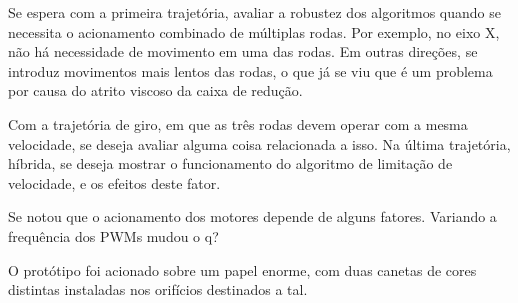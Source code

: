 Se espera com a primeira trajetória, avaliar a robustez dos algoritmos quando se necessita o acionamento combinado de múltiplas rodas. Por exemplo, no eixo X, não há necessidade de movimento em uma das rodas. Em outras direções, se introduz movimentos mais lentos das rodas, o que já se viu que é um problema por causa do atrito viscoso da caixa de redução.

Com a trajetória de giro, em que as três rodas devem operar com a mesma velocidade, se deseja avaliar alguma coisa relacionada a isso. Na última trajetória, híbrida, se deseja mostrar o funcionamento do algoritmo de limitação de velocidade, e os efeitos deste fator.

Se notou que o acionamento dos motores depende de alguns fatores. Variando a frequência dos PWMs mudou o q?

O protótipo foi acionado sobre um papel enorme, com duas canetas de cores distintas instaladas nos orifícios destinados a tal.
